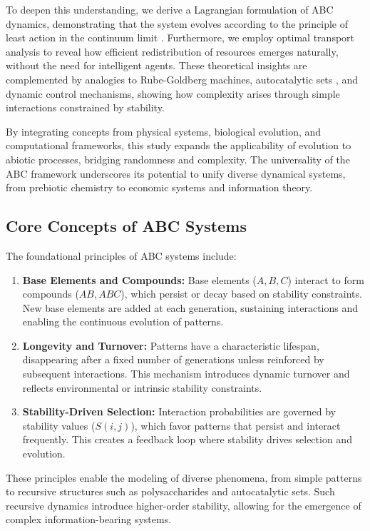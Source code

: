 \documentclass[%
 preprint, linenumbers,
 amsmath,amssymb,
 aps, physrev,
]{revtex4-2}
\begin{document}
To deepen this understanding, we derive a Lagrangian formulation of ABC dynamics, demonstrating that the system evolves according to the principle of least action in the continuum limit \cite{goldstein2002classical}. Furthermore, we employ optimal transport analysis \cite{villani2008optimal} to reveal how efficient redistribution of resources emerges naturally, without the need for intelligent agents. These theoretical insights are complemented by analogies to Rube-Goldberg machines, autocatalytic sets \cite{kauffman1996at}, and dynamic control mechanisms, showing how complexity arises through simple interactions constrained by stability.

By integrating concepts from physical systems, biological evolution, and computational frameworks, this study expands the applicability of evolution to abiotic processes, bridging randomness and complexity. The universality of the ABC framework underscores its potential to unify diverse dynamical systems, from prebiotic chemistry to economic systems and information theory.

\subsection{Core Concepts of ABC Systems}

The foundational principles of ABC systems include:
\begin{enumerate}
    \item \textbf{Base Elements and Compounds:}
    Base elements (\(A, B, C\)) interact to form compounds (\(AB, ABC\)), which persist or decay based on stability constraints. New base elements are added at each generation, sustaining interactions and enabling the continuous evolution of patterns.
    \item \textbf{Longevity and Turnover:}
    Patterns have a characteristic lifespan, disappearing after a fixed number of generations unless reinforced by subsequent interactions. This mechanism introduces dynamic turnover and reflects environmental or intrinsic stability constraints.
    \item \textbf{Stability-Driven Selection:}
    Interaction probabilities are governed by stability values (\(S(i, j)\)), which favor patterns that persist and interact frequently. This creates a feedback loop where stability drives selection and evolution.
\end{enumerate}

These principles enable the modeling of diverse phenomena, from simple patterns to recursive structures such as polysaccharides and autocatalytic sets. Such recursive dynamics introduce higher-order stability, allowing for the emergence of complex information-bearing systems.
\end{document}
